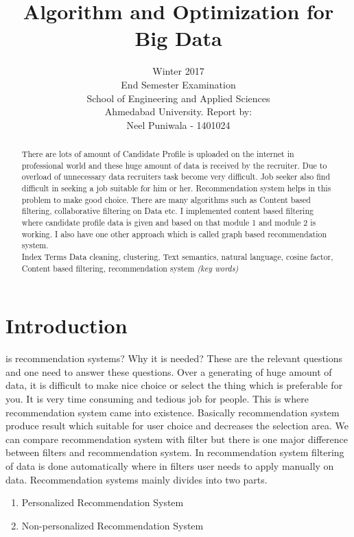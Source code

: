 \documentclass[journal, a4paper]{IEEEtran}
\begin{document}
	\title{Algorithm and Optimization for Big Data}
	\author{Winter 2017\\ 
		\vspace{0.5cm}
		End Semester Examination\\
		\vspace{0.2cm}
		School of Engineering and Applied Sciences\\
		Ahmedabad University.
		\linebreak\linebreak
		Report by:\\ Neel Puniwala - 1401024}
		
	\maketitle
\begin{abstract}There are lots of amount of Candidate Profile is uploaded on the internet in professional world and these huge amount of data is received by the recruiter. Due to overload of unnecessary data recruiters task become very difficult. Job seeker also find difficult in seeking a job suitable for him or her. Recommendation system helps in this problem to make good choice. There are many algorithms such as Content based filtering, collaborative filtering on Data etc. I implemented content based filtering where candidate profile data is given and based on that module 1 and module 2 is working. I also have one other approach which is called graph based recommendation system.\\
	Index Terms \textendash Data cleaning, clustering, Text semantics, natural language, cosine factor, Content based filtering, recommendation system \textit{(key words)}
\end{abstract}


\section{Introduction}
	 is recommendation systems? Why it is needed? These are the relevant questions and one need to answer these questions. Over a generating of huge amount of data, it is difficult to make nice choice or select the thing which is preferable for you. It is very time consuming and tedious job for people. This is where recommendation system came into existence. Basically recommendation system produce result which suitable for user choice and decreases the selection area. We can compare recommendation system with filter but there is one major difference between filters and recommendation system. In recommendation system filtering of data is done automatically where in filters user needs to apply manually on data. Recommendation systems mainly divides into two parts.     
	\begin{enumerate}
		\item Personalized Recommendation System
		\item Non-personalized Recommendation System
	\end{enumerate}
	
\end{document}
